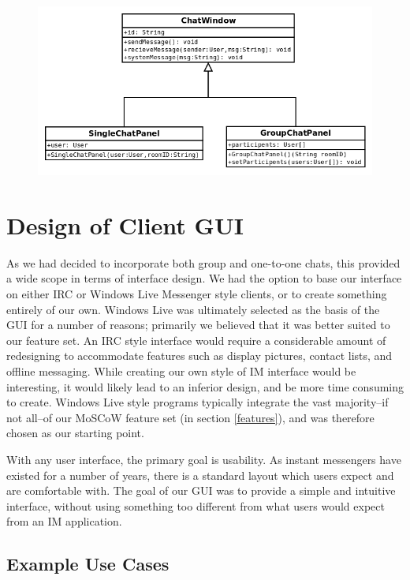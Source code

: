 \begin{figure}
    \begin{center}
        \includegraphics[scale=0.65]{Design/diagrams/chatwin.png}
        \label{chatwin}
    \end{center}
\end{figure}

\section{Design of Client GUI}
\label{gui_design}

As we had decided to incorporate both group and one-to-one chats, this provided a wide scope in terms of interface design. We had the option to base our interface on either IRC or Windows Live Messenger style clients, or to create something entirely of our own. Windows Live was ultimately selected as the basis of the GUI for a number of reasons; primarily we believed that it was better suited to our feature set. An IRC style interface would require a considerable amount of redesigning to accommodate features such as display pictures, contact lists, and offline messaging. While creating our own style of IM interface would be interesting, it would likely lead to an inferior design, and be more time consuming to create. Windows Live style programs typically integrate the vast majority--if not all--of our MoSCoW feature set (in section \ref{features}), and was therefore chosen as our starting point.

With any user interface, the primary goal is usability. As instant messengers have existed for a number of years, there is a standard layout which users expect and are comfortable with. The goal of our GUI was to provide a simple and intuitive interface, without using something too different from what users would expect from an IM application.
 
\subsection{Example Use Cases}

